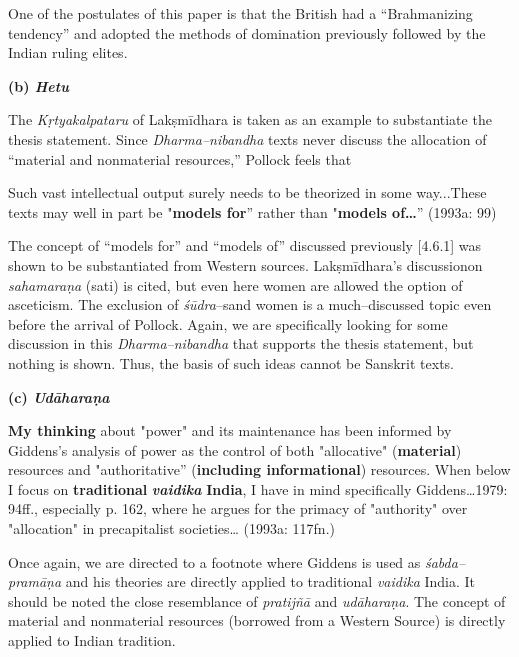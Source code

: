 One of the postulates of this paper is that the British had a “Brahmanizing tendency” and adopted the methods of domination previously followed by the Indian ruling elites.

\textbf{(b) \textit{Hetu}}

The \textit{Kṛtyakalpataru }of Lakṣmīdhara is taken as an example to substantiate the thesis statement. Since \textit{Dharma–nibandha} texts never discuss the allocation of “material and nonmaterial resources,” Pollock feels that

\begin{myquote}
Such vast intellectual output surely needs to be theorized in some way...These texts may well in part be "\textbf{models for}'' rather than "\textbf{models of…}” (1993a: 99)
\end{myquote}

The concept of “models for” and “models of” discussed previously [4.6.1] was shown to be substantiated from Western sources. Lakṣmīdhara’s discussionon \textit{sahamaraṇa} (sati) is cited, but even here women are allowed the option of asceticism. The exclusion of \textit{śūdra}–s\break and women is a much–discussed topic even before the arrival of Pollock. Again, we are specifically looking for some discussion in this \textit{Dharma–nibandha} that supports the thesis statement, but nothing is shown. Thus, the basis of such ideas cannot be Sanskrit texts.

\textbf{(c) \textit{Udāharaṇa}}

\begin{myquote}
\textbf{My thinking} about "power" and its maintenance has been informed by Giddens's analysis of power as the control of both "allocative" (\textbf{material}) resources and "authoritative'' (\textbf{including informational}) resources. When below I focus on \textbf{traditional }\textit{\textbf{vaidika }}\textbf{India}, I have in mind specifically Giddens…1979: 94ff., especially p. 162, where he argues for the primacy of "authority" over "allocation" in precapitalist societies… (1993a: 117fn.)
\end{myquote}

Once again, we are directed to a footnote where Giddens is used as \textit{śabda–pramāṇa} and his theories are directly applied to traditional \textit{vaidika} India. It should be noted the close resemblance of \textit{pratijñā} and \textit{udāharaṇa}. The concept of material and nonmaterial resources (borrowed from a Western Source) is directly applied to Indian tradition.

